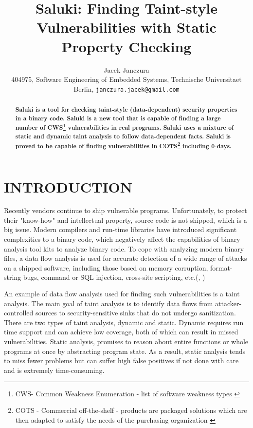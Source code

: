 \documentclass[a4paper, 12pt, journal, onecolumn]{IEEEtran}
\title{\LARGE \bf
Saluki: Finding Taint-style Vulnerabilities with Static Property Checking
}
\author{Jacek Janczura \\ \small{404975, Software Engineering of Embedded Systems, Technische Universitaet Berlin, {\tt janczura.jacek@gmail.com}}}%
\begin{document}
\maketitle
\thispagestyle{fancy}
\pagestyle{fancy}


\begin{abstract}
\textbf{Saluki is a tool for checking taint-style (data-dependent) security properties in a binary code. Saluki is a new tool that is capable of finding a large number of CWS\footnote{CWS- Common Weakness Enumeration - list of software weakness types \cite{a2}} vulnerabilities in real programs. Saluki uses a mixture of static and dynamic taint analysis to follow data-dependent facts. Saluki is proved to be capable of finding vulnerabilities in COTS\footnote{ COTS - Commercial off-the-shelf -  products are packaged solutions which are then adapted to satisfy the needs of the purchasing organization \cite{a1}} including 0-days.}

\end{abstract}


\section{INTRODUCTION}

Recently vendors continue to ship vulnerable programs. Unfortunately, to protect their "know-how" and intellectual property, source code is not shipped, which is a big issue. Modern compilers and run-time libraries have introduced significant complexities to a binary code, which negatively affect the capabilities of binary analysis tool kits to analyze binary code. \cite{binaries} To cope with analyzing modern binary files, a data flow analysis is used for accurate detection of a wide range of attacks on a shipped software, including those based on memory corruption, format-string bugs, command or SQL injection, cross-site scripting, etc.(\cite{a7}, \cite{Pietraszek2006})

An example of data flow analysis used for finding such vulnerabilities is a taint analysis. The main goal of taint analysis is to identify data flows from attacker-controlled sources to security-sensitive sinks that do not undergo sanitization.\cite{a5} \cite{a6}
There are two types of taint analysis, dynamic and static. \cite{sdtaint} Dynamic requires run time support and can achieve low coverage, both of which can result in missed vulnerabilities. Static analysis, promises to reason about entire functions or whole programs at once by abstracting program state. As a result, static analysis tends to miss fewer problems but can suffer high false positives if not done with care and is extremely time-consuming. \cite{saluki} 
\end{document}
